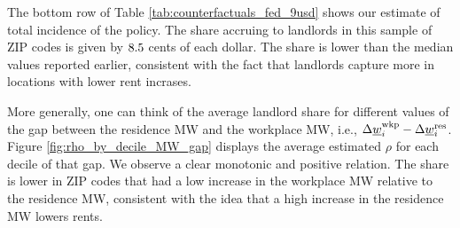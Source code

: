 The bottom row of Table \ref{tab:counterfactuals_fed_9usd} shows our estimate
of total incidence of the policy.
The share accruing to landlords in this sample of ZIP codes is given by 
$\textnormal{8.5}$ cents of each dollar.
The share is lower than the median values reported earlier, consistent with
the fact that landlords capture more in locations with lower rent incrases.

More generally, one can think of the average landlord share for different 
values of the gap between the residence MW and the workplace MW, 
i.e., $\Delta \underline{w}_i^{\text{wkp}} - \Delta \underline{w}_i^{\text{res}}$.
Figure \ref{fig:rho_by_decile_MW_gap} displays the average estimated $\rho$ for 
each decile of that gap.
We observe a clear monotonic and positive relation.
The share is lower in ZIP codes that had a low increase in the workplace MW 
relative to the residence MW, consistent with the idea that a high increase 
in the residence MW lowers rents.

